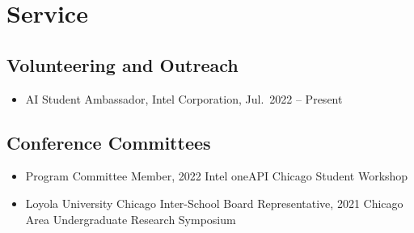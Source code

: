 \section*{Service}

\subsection*{Volunteering and Outreach}

\begin{itemize}
\item
AI Student Ambassador, Intel Corporation,
Jul.\ 2022 -- Present
\end{itemize}

\subsection*{Conference Committees}

\begin{itemize}
\item
Program Committee Member,
2022 Intel oneAPI Chicago Student Workshop

\item
Loyola University Chicago Inter-School Board Representative,
2021 Chicago Area Undergraduate Research Symposium
\end{itemize}